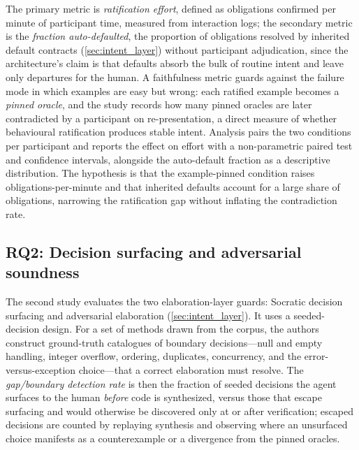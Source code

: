 The primary metric is \emph{ratification effort}, defined as obligations confirmed per minute of participant time, measured from interaction logs; the secondary metric is the \emph{fraction auto-defaulted}, the proportion of obligations resolved by inherited default contracts (\cref{sec:intent_layer}) without participant adjudication, since the architecture's claim is that defaults absorb the bulk of routine intent and leave only departures for the human. A faithfulness metric guards against the failure mode in which examples are easy but wrong: each ratified example becomes a \emph{pinned oracle}, and the study records how many pinned oracles are later contradicted by a participant on re-presentation, a direct measure of whether behavioural ratification produces stable intent. Analysis pairs the two conditions per participant and reports the effect on effort with a non-parametric paired test and confidence intervals, alongside the auto-default fraction as a descriptive distribution. The hypothesis is that the example-pinned condition raises obligations-per-minute and that inherited defaults account for a large share of obligations, narrowing the ratification gap without inflating the contradiction rate.

\subsection{RQ2: Decision surfacing and adversarial soundness}\label{subsec:eval_rq2}

The second study evaluates the two elaboration-layer guards: Socratic decision surfacing and adversarial elaboration (\cref{sec:intent_layer}). It uses a seeded-decision design. For a set of methods drawn from the corpus, the authors construct ground-truth catalogues of boundary decisions---null and empty handling, integer overflow, ordering, duplicates, concurrency, and the error-versus-exception choice---that a correct elaboration must resolve. The \emph{gap/boundary detection rate} is then the fraction of seeded decisions the agent surfaces to the human \emph{before} code is synthesized, versus those that escape surfacing and would otherwise be discovered only at or after verification; escaped decisions are counted by replaying synthesis and observing where an unsurfaced choice manifests as a counterexample or a divergence from the pinned oracles.

